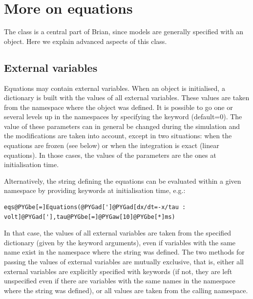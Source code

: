 \documentclass[letterpaper,10pt]{manual}
\begin{document}
\resetcurrentobjects
{}

\hypertarget{index-5}{}\section{More on equations}

The \hyperlink{brian.Equations}{} class is a central part of Brian, since
models are generally specified with an \hyperlink{brian.Equations}{} object.
Here we explain advanced aspects of this class.

\hypertarget{index-6}{}\subsection{External variables}

Equations may contain external variables. When an \hyperlink{brian.Equations}{} object is initialised,
a dictionary is built with the values of all external variables. These values are taken
from the namespace where the \hyperlink{brian.Equations}{} object was defined. It is possible to go one or
several levels up in the namespaces by specifying the keyword  (default=0).
The value of these parameters can in general be changed during the simulation and the
modifications are taken into account, except in two situations: when the equations are
frozen (see below) or when the integration is exact (linear equations). In those cases,
the values of the parameters are the ones at initialisation time.

Alternatively, the string defining the equations can be evaluated within a given namespace
by providing keywords at initialisation time, e.g.:

\begin{Verbatim}[commandchars=@\[\]]
eqs@PYGbe[=]Equations(@PYGad[']@PYGad[dx/dt=-x/tau : volt]@PYGad['],tau@PYGbe[=]@PYGaw[10]@PYGbe[*]ms)
\end{Verbatim}

In that case, the values of all external variables are taken from the specified
dictionary (given by the keyword arguments), even if variables with the same name
exist in the namespace where the string was defined. The two methods for passing the
values of external variables are mutually exclusive, that is, either all external variables
are explicitly specified with keywords (if not, they are left unspecified even if there
are variables with the same names in the namespace where the string was defined), or all
values are taken from the calling namespace.
\end{document}
